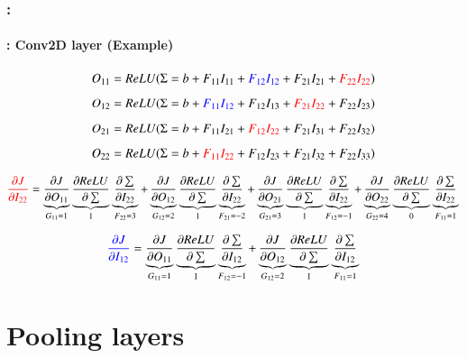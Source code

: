\documentclass[xcolor=table]{beamer}
\begin{document}
\begin{frame}
	\frametitle{\insertshortsubtitle: \insertsection}
	\framesubtitle{\insertsubsection: Conv2D layer (Example)}
	
	
	\begin{center}
		\vskip-6pt
	\end{center}\vskip-16pt
	
	{\scriptsize 
		\[O_{11} = ReLU(\Sigma = b + F_{11} I_{11} + \textcolor{blue}{F_{12} I_{12}} + F_{21} I_{21} + \textcolor{red}{F_{22} I_{22}})  \]
		\[O_{12} = ReLU(\Sigma = b + \textcolor{blue}{F_{11} I_{12}} + F_{12} I_{13} + \textcolor{red}{F_{21} I_{22}} + F_{22} I_{23})  \]
		\[O_{21} = ReLU(\Sigma = b + F_{11} I_{21} + \textcolor{red}{F_{12} I_{22}} + F_{21} I_{31} + F_{22} I_{32})  \]
		\[O_{22} = ReLU(\Sigma = b + \textcolor{red}{F_{11} I_{22}} + F_{12} I_{23} + F_{21} I_{32} + F_{22} I_{33})  \]
		
		\[\textcolor{red}{\frac{\partial J}{\partial I_{22}}} 
		= \underbrace{\frac{\partial J}{\partial O_{11}}}_{G_{11} = 1} 
		\underbrace{\frac{\partial ReLU}{\partial \sum}}_{1} 
		\underbrace{\frac{\partial \sum}{\partial I_{22}}}_{F_{22} = 3}
		+ \underbrace{\frac{\partial J}{\partial O_{12}}}_{G_{12} = 2} 
		\underbrace{\frac{\partial ReLU}{\partial \sum}}_{1} 
		\underbrace{\frac{\partial \sum}{\partial I_{22}}}_{F_{21} = -2}
		+ \underbrace{\frac{\partial J}{\partial O_{21}}}_{G_{21} = 3} 
		\underbrace{\frac{\partial ReLU}{\partial \sum}}_{1} 
		\underbrace{\frac{\partial \sum}{\partial I_{22}}}_{F_{12} = -1}
		+ \underbrace{\frac{\partial J}{\partial O_{22}}}_{G_{22} = 4} 
		\underbrace{\frac{\partial ReLU}{\partial \sum}}_{0} 
		\underbrace{\frac{\partial \sum}{\partial I_{22}}}_{F_{11} = 1}\]
		
		\[\textcolor{blue}{\frac{\partial J}{\partial I_{12}}} 
		= \underbrace{\frac{\partial J}{\partial O_{11}}}_{G_{11} = 1} 
		\underbrace{\frac{\partial ReLU}{\partial \sum}}_{1} 
		\underbrace{\frac{\partial \sum}{\partial I_{12}}}_{F_{12} = -1}
		+ \underbrace{\frac{\partial J}{\partial O_{12}}}_{G_{12} = 2} 
		\underbrace{\frac{\partial ReLU}{\partial \sum}}_{1} 
		\underbrace{\frac{\partial \sum}{\partial I_{12}}}_{F_{11} = 1}\]
	}
	
\end{frame}

\section{Pooling layers}
\end{document}
